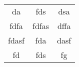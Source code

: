 \begin{tabular}{ c c c }
    da & fds & dsa \\ 
    fdfa & fdfas & dffa \\ 
    fdasf & fda & dasf \\ 
    fd & fds & fg \\ 
\end{tabular}

\label{tab:Cast}